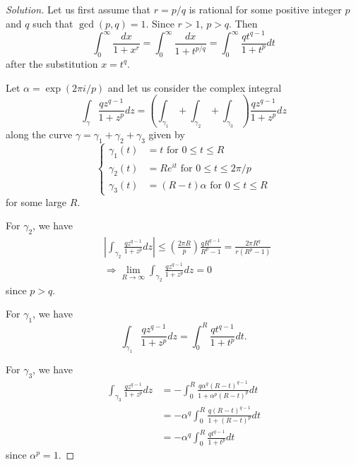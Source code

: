 \documentclass[11pt]{amsart}
\theoremstyle{remark}
\theoremstyle{definition}
\numberwithin{equation}{section}
\begin{document}
\begin{proof}[Solution]
    Let us first assume that $r = p/q$ is rational for some positive integer $p$ and $q$ such that $\gcd(p,q) = 1$. Since $r > 1$, $p>q$.
    Then
    \[
        \int_0^\infty \frac{dx}{1+x^r}
        = \int_0^\infty \frac{dx}{1+t^{p/q}}
        = \int_0^\infty \frac{q t^{q-1}}{1+t^p} dt
    \]
    after the substitution $x = t^q$.

    Let $\alpha = \exp(2\pi i/p)$ and let us consider the complex integral
    \begin{equation}\label{MATH41117FFRE000}
        \int_{\gamma} \frac{q z^{q-1}}{1+z^p} dz
        = \left( \int_{\gamma_1} + \int_{\gamma_2} + \int_{\gamma_3} \right) \frac{q z^{q-1}}{1+z^p} dz
    \end{equation}
    along the curve $\gamma = \gamma_1 + \gamma_2 + \gamma_3$ given by
    \[
        \left\{
        \begin{aligned}
            \gamma_1(t) & = t \text{ for } 0\le t \le R              \\
            \gamma_2(t) & = R e^{it} \text{ for } 0 \le t \le 2\pi/p \\
            \gamma_3(t) & = (R-t) \alpha \text{ for } 0 \le t \le R
        \end{aligned}
        \right.
    \]
    for some large $R$.

    For $\gamma_2$, we have
    \begin{equation}\label{MATH41117FFRE001}
        \begin{aligned}
             & \left|\int_{\gamma_2} \frac{q z^{q-1}}{1+z^p} dz\right|
            \le \left(\frac{2\pi R}{p}\right) \frac{q R^{q-1}}{R^p - 1}
            = \frac{2\pi R^q}{r(R^p - 1)}
            \\
             & \Rightarrow \lim_{R\to\infty} \int_{\gamma_2} \frac{q z^{q-1}}{1+z^p} dz = 0
        \end{aligned}
    \end{equation}
    since $p > q$.

    For $\gamma_1$, we have
    \begin{equation}\label{MATH41117FFRE002}
        \int_{\gamma_1} \frac{q z^{q-1}}{1+z^p} dz
        = \int_0^R \frac{q t^{q-1}}{1+t^p} dt.
    \end{equation}

    For $\gamma_3$, we have
    \begin{equation}\label{MATH41117FFRE003}
        \begin{aligned}
            \int_{\gamma_3} \frac{q z^{q-1}}{1+z^p} dz
             & = -\int_0^R \frac{q \alpha^{q}(R-t)^{q-1}}{1+\alpha^p (R-t)^p} dt
            \\
             & = -\alpha^{q} \int_0^R \frac{q (R-t)^{q-1}}{1+ (R-t)^p} dt
            \\
             & = -\alpha^{q} \int_0^R \frac{q t^{q-1}}{1+ t^p} dt
        \end{aligned}
    \end{equation}
    since $\alpha^p = 1$.


\end{proof}
\end{document}
